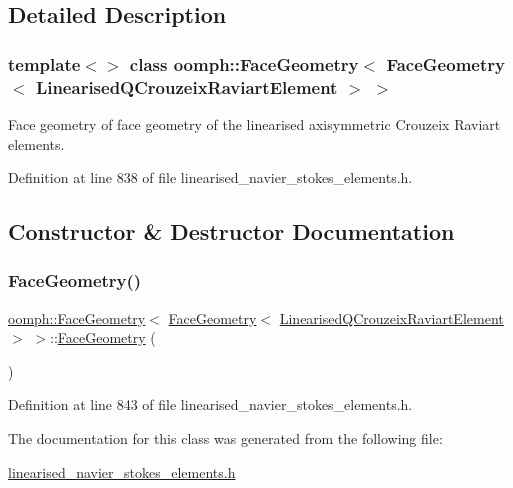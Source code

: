 \subsection{Detailed Description}
\subsubsection*{template$<$$>$\newline
class oomph\+::\+Face\+Geometry$<$ Face\+Geometry$<$ Linearised\+Q\+Crouzeix\+Raviart\+Element $>$ $>$}

Face geometry of face geometry of the linearised axisymmetric Crouzeix Raviart elements. 

Definition at line 838 of file linearised\+\_\+navier\+\_\+stokes\+\_\+elements.\+h.



\subsection{Constructor \& Destructor Documentation}
\mbox{\label{classoomph_1_1FaceGeometry_3_01FaceGeometry_3_01LinearisedQCrouzeixRaviartElement_01_4_01_4_a75833f93e7e89e54a5c2da853cf25c38}} 
\subsubsection{\texorpdfstring{Face\+Geometry()}{FaceGeometry()}}
{\footnotesize\ttfamily \hyperlink{classoomph_1_1FaceGeometry}{oomph\+::\+Face\+Geometry}$<$ \hyperlink{classoomph_1_1FaceGeometry}{Face\+Geometry}$<$ \hyperlink{classoomph_1_1LinearisedQCrouzeixRaviartElement}{Linearised\+Q\+Crouzeix\+Raviart\+Element} $>$ $>$\+::\hyperlink{classoomph_1_1FaceGeometry}{Face\+Geometry} (\begin{DoxyParamCaption}{ }\end{DoxyParamCaption})\hspace{0.3cm}{\ttfamily [inline]}}



Definition at line 843 of file linearised\+\_\+navier\+\_\+stokes\+\_\+elements.\+h.



The documentation for this class was generated from the following file\+:\begin{DoxyCompactItemize}
\item 
\hyperlink{linearised__navier__stokes__elements_8h}{linearised\+\_\+navier\+\_\+stokes\+\_\+elements.\+h}\end{DoxyCompactItemize}
